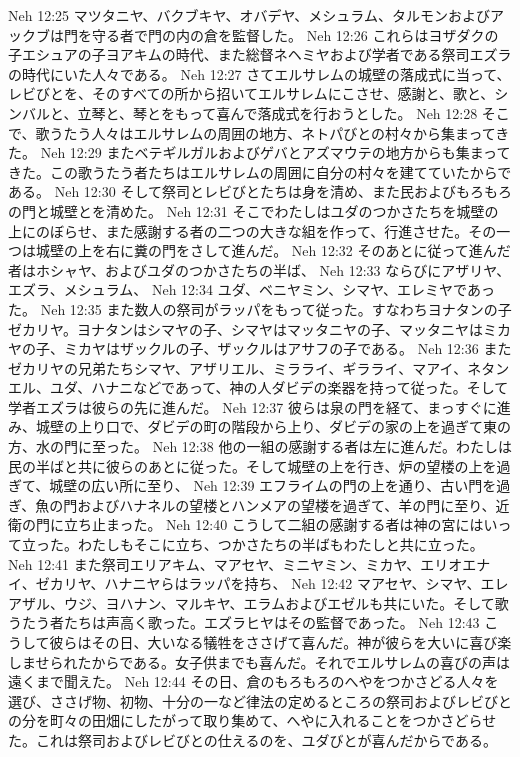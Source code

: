 Neh 12:25  マツタニヤ、バクブキヤ、オバデヤ、メシュラム、タルモンおよびアックブは門を守る者で門の内の倉を監督した。
Neh 12:26  これらはヨザダクの子エシュアの子ヨアキムの時代、また総督ネヘミヤおよび学者である祭司エズラの時代にいた人々である。
Neh 12:27  さてエルサレムの城壁の落成式に当って、レビびとを、そのすべての所から招いてエルサレムにこさせ、感謝と、歌と、シンバルと、立琴と、琴とをもって喜んで落成式を行おうとした。
Neh 12:28  そこで、歌うたう人々はエルサレムの周囲の地方、ネトパびとの村々から集まってきた。
Neh 12:29  またベテギルガルおよびゲバとアズマウテの地方からも集まってきた。この歌うたう者たちはエルサレムの周囲に自分の村々を建てていたからである。
Neh 12:30  そして祭司とレビびとたちは身を清め、また民およびもろもろの門と城壁とを清めた。
Neh 12:31  そこでわたしはユダのつかさたちを城壁の上にのぼらせ、また感謝する者の二つの大きな組を作って、行進させた。その一つは城壁の上を右に糞の門をさして進んだ。
Neh 12:32  そのあとに従って進んだ者はホシャヤ、およびユダのつかさたちの半ば、
Neh 12:33  ならびにアザリヤ、エズラ、メシュラム、
Neh 12:34  ユダ、ベニヤミン、シマヤ、エレミヤであった。
Neh 12:35  また数人の祭司がラッパをもって従った。すなわちヨナタンの子ゼカリヤ。ヨナタンはシマヤの子、シマヤはマッタニヤの子、マッタニヤはミカヤの子、ミカヤはザックルの子、ザックルはアサフの子である。
Neh 12:36  またゼカリヤの兄弟たちシマヤ、アザリエル、ミラライ、ギラライ、マアイ、ネタンエル、ユダ、ハナニなどであって、神の人ダビデの楽器を持って従った。そして学者エズラは彼らの先に進んだ。
Neh 12:37  彼らは泉の門を経て、まっすぐに進み、城壁の上り口で、ダビデの町の階段から上り、ダビデの家の上を過ぎて東の方、水の門に至った。
Neh 12:38  他の一組の感謝する者は左に進んだ。わたしは民の半ばと共に彼らのあとに従った。そして城壁の上を行き、炉の望楼の上を過ぎて、城壁の広い所に至り、
Neh 12:39  エフライムの門の上を通り、古い門を過ぎ、魚の門およびハナネルの望楼とハンメアの望楼を過ぎて、羊の門に至り、近衛の門に立ち止まった。
Neh 12:40  こうして二組の感謝する者は神の宮にはいって立った。わたしもそこに立ち、つかさたちの半ばもわたしと共に立った。
Neh 12:41  また祭司エリアキム、マアセヤ、ミニヤミン、ミカヤ、エリオエナイ、ゼカリヤ、ハナニヤらはラッパを持ち、
Neh 12:42  マアセヤ、シマヤ、エレアザル、ウジ、ヨハナン、マルキヤ、エラムおよびエゼルも共にいた。そして歌うたう者たちは声高く歌った。エズラヒヤはその監督であった。
Neh 12:43  こうして彼らはその日、大いなる犠牲をささげて喜んだ。神が彼らを大いに喜び楽しませられたからである。女子供までも喜んだ。それでエルサレムの喜びの声は遠くまで聞えた。
Neh 12:44  その日、倉のもろもろのへやをつかさどる人々を選び、ささげ物、初物、十分の一など律法の定めるところの祭司およびレビびとの分を町々の田畑にしたがって取り集めて、へやに入れることをつかさどらせた。これは祭司およびレビびとの仕えるのを、ユダびとが喜んだからである。
